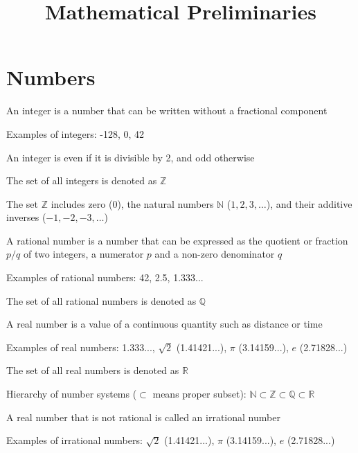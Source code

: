 \documentclass[8pt,a4paper,compress]{beamer}
\title{Mathematical Preliminaries}
\date{}
\begin{document}
\begin{frame}
\vfill
\titlepage
\end{frame}

\section{Numbers}
\begin{frame}[fragile]
\pause\transdissolve

An integer is a number that can be written without a fractional component

\pause\transdissolve\bigskip

Examples of integers: -128, 0, 42

\pause\transdissolve\bigskip

An integer is even if it is divisible by 2, and odd otherwise

\pause\transdissolve\bigskip

The set of all integers is denoted as $\mathbb{Z}$

\pause\transdissolve\bigskip

The set $\mathbb{Z}$ includes zero (0), the natural numbers $\mathbb{N}$ ($1, 2, 3, \dots$), and their additive inverses ($-1, -2, -3, \dots$)
\end{frame}

\begin{frame}[fragile]
\pause\transdissolve

A rational number is a number that can be expressed as the quotient or fraction $p/q$ of two integers, a numerator $p$ and a non-zero denominator $q$

\pause\transdissolve\bigskip

Examples of rational numbers: 42, 2.5, 1.333...

\pause\transdissolve\bigskip

The set of all rational numbers is denoted as $\mathbb{Q}$
\end{frame}

\begin{frame}[fragile]
\pause\transdissolve

A real number is a value of a continuous quantity such as distance or time

\pause\transdissolve\bigskip

Examples of real numbers: 1.333..., $\sqrt{2}$ (1.41421...), $\pi$ (3.14159...), $e$ (2.71828...)

\pause\transdissolve\bigskip

The set of all real numbers is denoted as $\mathbb{R}$

\pause\transdissolve\bigskip

Hierarchy of number systems ($\subset$ means proper subset): $\mathbb{N} \subset \mathbb{Z} \subset \mathbb{Q} \subset \mathbb{R}$

\pause\transdissolve\bigskip

A real number that is not rational is called an irrational number

\pause\transdissolve\bigskip

Examples of irrational numbers: $\sqrt{2}$ (1.41421...), $\pi$ (3.14159...), $e$ (2.71828...)
\end{frame}
\end{document}
